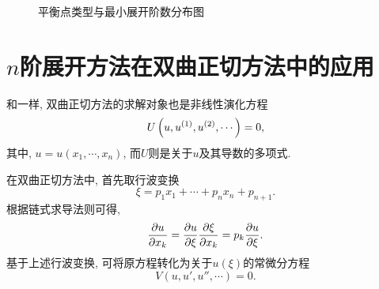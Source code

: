 \begin{figure}[htbp]
\centering
{}
\caption{平衡点类型与最小展开阶数分布图}
\end{figure}

\section{$n$阶展开方法在双曲正切方法中的应用}\label{ch4sec5}
和一样, 双曲正切方法的求解对象也是非线性演化方程
\begin{equation}
    U\left(u,u^{(1)},u^{(2)},\cdots\right)=0,
\end{equation}
其中, $u=u(x_1,\cdots,x_n)$, 而$U$则是关于$u$及其导数的多项式. 

在双曲正切方法中, 首先取行波变换 
\begin{equation}
    \xi = p_1 x_1 +\cdots + p_n x_n + p_{n+1}.  \label{tanh-tw}
\end{equation}
根据链式求导法则可得,
\begin{equation}
    \frac{\partial u}{\partial x_k}=\frac{\partial u}{\partial \xi}\frac{\partial \xi}{\partial x_k}=p_k\frac{\partial u}{\partial \xi}.
\end{equation}
基于上述行波变换, 可将原方程转化为关于$u(\xi)$的常微分方程
\begin{equation}
    V(u,u',u'',\cdots)=0. \label{odeq}
\end{equation}

